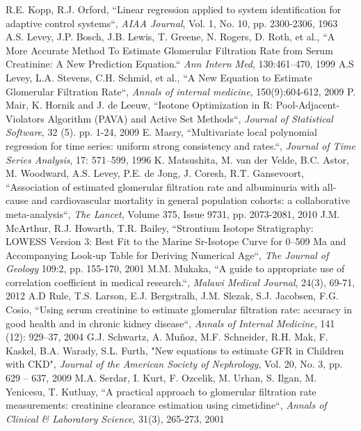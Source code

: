 \documentclass[10pt,final]{siamltex}
\begin{document}
\begin{thebibliography}{99}
  R.E. Kopp, R.J. Orford, ``Linear regression applied to system identification for adaptive control systems``, \textit{AIAA Journal}, Vol. 1, No. 10, pp. 2300-2306, 1963
   A.S. Levey, J.P. Bosch, J.B. Lewis, T. Greene, N. Rogers, D. Roth, et al., ``A More Accurate Method To Estimate Glomerular Filtration Rate from Serum Creatinine: A New Prediction Equation.`` \textit{Ann Intern Med}, 130:461–470, 1999
   A.S Levey, L.A. Stevens, C.H. Schmid, et al., ``A New Equation to Estimate Glomerular Filtration Rate``, \textit{Annals of internal medicine}, 150(9):604-612, 2009
   P. Mair, K. Hornik and J. de Leeuw, ``Isotone Optimization in R: Pool-Adjacent-Violators Algorithm (PAVA) and Active Set Methods``, \textit{Journal of Statistical Software}, 32 (5). pp. 1-24, 2009
   E. Masry, ``Multivariate local polynomial regression for time series: uniform strong consistency and rates.``, \textit{Journal of Time Series Analysis}, 17: 571–599, 1996
   K. Matsushita, M. van der Velde, B.C. Astor, M. Woodward, A.S. Levey, P.E. de Jong, J. Coresh, R.T. Gansevoort, ``Association of estimated glomerular filtration rate and albuminuria with all-cause and cardiovascular mortality in general population cohorts: a collaborative meta-analysis``, \textit{The Lancet}, Volume 375, Issue 9731, pp. 2073-2081, 2010
  J.M. McArthur, R.J. Howarth, T.R. Bailey, ``Strontium Isotope Stratigraphy: LOWESS Version 3: Best Fit to the Marine Sr‐Isotope Curve for 0–509 Ma and Accompanying Look‐up Table for Deriving Numerical Age``, \textit{The Journal of Geology} 109:2, pp. 155-170, 2001
   M.M. Mukaka, ``A guide to appropriate use of correlation coefficient in medical research.``, \textit{Malawi Medical Journal}, 24(3), 69-71, 2012
  A.D Rule, T.S. Larson, E.J. Bergstralh, J.M. Slezak, S.J. Jacobsen, F.G. Cosio, ``Using serum creatinine to estimate glomerular filtration rate: accuracy in good health and in chronic kidney disease``, \textit{Annals of Internal Medicine}, 141 (12): 929–37, 2004
   G.J. Schwartz, A. Muñoz, M.F. Schneider, R.H. Mak, F. Kaskel, B.A. Warady, S.L. Furth, "New equations to estimate GFR in Children with CKD", \textit{Journal of the American Society of Nephrology}, Vol. 20, No. 3, pp. 629 – 637, 2009
  M.A. Serdar, I. Kurt, F. Ozcelik, M. Urhan, S. Ilgan, M. Yenicesu, T. Kutluay, ``A practical approach to glomerular filtration rate measurements: creatinine clearance estimation using cimetidine``, \textit{Annals of Clinical \& Laboratory Science}, 31(3), 265-273, 2001

\end{thebibliography}
\end{document}

